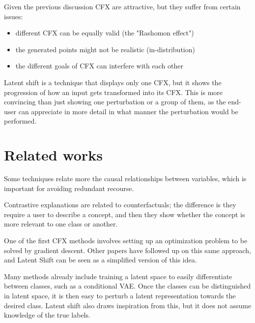 \documentclass[../main.tex]{subfiles}
\begin{document}
Given the previous discussion CFX are attractive, but they suffer from certain issues:
\begin{itemize}
    \item different CFX can be equally valid (the "Rashomon effect")
    \item the generated points might not be realistic (in-distribution)
    \item the different goals of CFX can interfere with each other
\end{itemize}

Latent shift is a technique that displays only one CFX, but it shows the progression of how an input gets transformed into its CFX. This is more convincing than just showing one perturbation or a group of them, as the end-user can appreciate in more detail in what manner the perturbation would be performed.


\section{Related works}

Some techniques relate more the causal relationships between variables, which is important for avoiding redundant recourse.

Contrastive explanations are related to counterfactuals; the difference is they require a user to describe a concept, and then they show whether the concept is more relevant to one class or another.

One of the first CFX methods involves setting up an optimization problem to be solved by gradient descent. Other papers have followed up on this same approach, and Latent Shift can be seen as a simplified version of this idea.

Many methods already include training a latent space to easily differentiate between classes, such as a conditional VAE. Once the classes can be distinguished in latent space, it is then easy to perturb a latent representation towards the desired class. Latent shift also draws inspiration from this, but it does not assume knowledge of the true labels.

\end{document}
